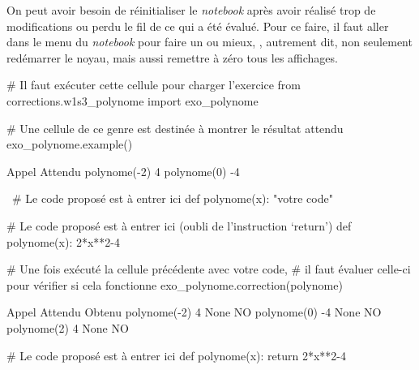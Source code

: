 On peut avoir besoin de réinitialiser le \textit{notebook} après avoir réalisé trop de modifications ou perdu le fil de ce qui a été évalué. Pour ce faire, il faut aller dans le menu du \textit{notebook} pour faire un  ou mieux, , autre\-ment dit, non seulement redémarrer le noyau, mais aussi remettre à zéro tous les affichages.

\vspace{4pt}

\begin{jazzfigure}
\begin{nbjupyterin}{1}
# Il faut exécuter cette cellule pour charger l'exercice
from corrections.w1s3_polynome import exo_polynome
\end{nbjupyterin}
\vspace{2pt}
\begin{nbjupyterin}{2}
# Une cellule de ce genre est destinée à montrer le résultat attendu
exo_polynome.example()
\end{nbjupyterin}
\begin{nbjupyterout}{2}
Appel          Attendu
polynome(-2)    4
polynome(0)    -4
\end{nbjupyterout}
\begin{nbjupyterin}{\,}
# Le code proposé est à entrer ici
def polynome(x):
    "votre code"
\end{nbjupyterin}
\vspace{2pt}
\begin{nbjupyterin}{3}
# Le code proposé est à entrer ici (oubli de l'instruction `return')
def polynome(x):
    2*x**2-4
\end{nbjupyterin}
\vspace{2pt}
\begin{nbjupyterin}{4}
# Une fois exécuté la cellule précédente avec votre code,
# il faut évaluer celle-ci pour vérifier si cela fonctionne
exo_polynome.correction(polynome)
\end{nbjupyterin}
\begin{nbjupyterout}[colback=pynbcodefalsebgcolor]{4}
Appel          Attendu      Obtenu
polynome(-2)     4           None     NO
polynome(0)     -4           None     NO
polynome(2)      4           None     NO
\end{nbjupyterout}
\vspace{2pt}
\begin{nbjupyterin}{3}
# Le code proposé est à entrer ici
def polynome(x):
    return 2*x**2-4
\end{nbjupyterin}

\end{jazzfigure}

